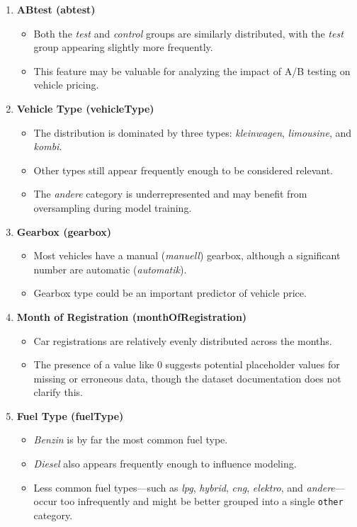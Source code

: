 \documentclass[conference]{IEEEtran}
\begin{document}
\begin{enumerate}
    \item \textbf{ABtest (abtest)}
    \begin{itemize}
        \item Both the \textit{test} and \textit{control} groups are similarly
                distributed, with the \textit{test} group appearing slightly
                more frequently.
        \item This feature may be valuable for analyzing the impact of A/B
                testing on vehicle pricing.
    \end{itemize}
    
    \item \textbf{Vehicle Type (vehicleType)}
    \begin{itemize}
        \item The distribution is dominated by three types:
                \textit{kleinwagen}, \textit{limousine}, and \textit{kombi}.
        \item Other types still appear frequently enough to be considered relevant.
        \item The \textit{andere} category is underrepresented and may benefit
                from oversampling during model training.
    \end{itemize}
    
    \item \textbf{Gearbox (gearbox)}
    \begin{itemize}
        \item Most vehicles have a manual (\textit{manuell}) gearbox, although
                a significant number are automatic (\textit{automatik}).
        \item Gearbox type could be an important predictor of vehicle price.
    \end{itemize}
    
    \item \textbf{Month of Registration (monthOfRegistration)}
    \begin{itemize}
        \item Car registrations are relatively evenly distributed across the months.
        \item The presence of a value like 0 suggests potential
                placeholder values for missing or erroneous data, though the
                dataset documentation does not clarify this.
    \end{itemize}
    
    \item \textbf{Fuel Type (fuelType)}
    \begin{itemize}
        \item \textit{Benzin} is by far the most common fuel type.
        \item \textit{Diesel} also appears frequently enough to influence modeling.
        \item Less common fuel types—such as \textit{lpg}, \textit{hybrid},
                \textit{cng}, \textit{elektro}, and \textit{andere}—occur too
                infrequently and might be better grouped into a single
                \texttt{other} category.
    \end{itemize}


\end{enumerate}
\end{document}
